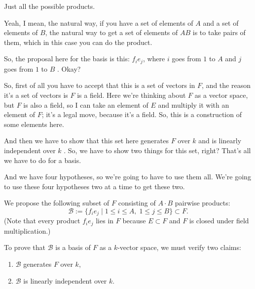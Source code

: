 \begin{proofWrapper}
\begin{student}
Just all the possible products.
\end{student}

\begin{speech}[00:28:01 - 00:29:43]
Yeah, I mean, the natural way, if you have a set of elements of $A$ and a set of elements of $B$, the natural way to get a set of elements of $AB$ is to take pairs of them, which in this case you can do the product.

So, the proposal here for the basis is this: $f_i e_j$, where $i$ goes from $1$ to $A$ and $j$ goes from $1$ to $B$ . Okay?

So, first of all you have to accept that this is a set of vectors in $F$, and the reason it's a set of vectors is $F$ is a field. Here we're thinking about $F$ as a vector space, but $F$ is also a field, so I can take an element of $E$ and multiply it with an element of $F$; it's a legal move, because it's a field. So, this is a construction of some elements here.

And then we have to show that this set here generates $F$ over $k$ and is linearly independent over $k$ . So, we have to show two things for this set, right? That's all we have to do for a basis.

And we have four hypotheses, so we're going to have to use them all. We're going to use these four hypotheses two at a time to get these two.
\end{speech}

\begin{content}
We propose the following subset of $F$ consisting of $A \cdot B$ pairwise products:
\[
\mathcal{B} := \{ f_i e_j \mid 1 \le i \le A,\; 1 \le j \le B \} \subset F.
\]
(Note that every product $f_i e_j$ lies in $F$ because $E \subset F$ and $F$ is closed under field multiplication.)

To prove that $\mathcal{B}$ is a basis of $F$ as a $k$-vector space, we must verify two claims:
\begin{enumerate}[label=\textbf{(\arabic*)}]
    \item $\mathcal{B}$ generates $F$ over $k$,
    \item $\mathcal{B}$ is linearly independent over $k$.
\end{enumerate}
\end{content}


\end{proofWrapper}
